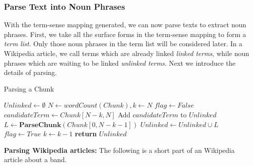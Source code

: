 \subsubsection{Parse Text into Noun Phrases}
\label{sec:parse}
With the term-sense mapping generated, we can now parse texts to
extract noun phrases.
First, we take all the surface forms in the term-sense mapping to
form a {\em term list}.
Only those noun phrases in the term list will be considered later.
In a Wikipedia article, we call terms which are already linked {\em linked terms},
while noun phrases which are waiting to be linked {\em unlinked terms}.
Next we introduce the details of parsing.

\begin{algorithm}[th]
\caption{Parsing a Chunk}
\label{parsechunk}
\begin{algorithmic}[1]
\State $Unlinked\leftarrow \emptyset$
\State $N\leftarrow wordCount(Chunk), k\leftarrow N$
\State $flag\leftarrow False$
\State $candidateTerm \leftarrow Chunk[N-k,N]$
\State Add $candidateTerm$ to $Unlinked$
\State $L \leftarrow \textbf{ParseChunk}(Chunk[0,N-k-1])$
\State $Unlinked \leftarrow Unlinked\cup L$
\State $flag\leftarrow True$
\EndIf
\EndIf
\State $k\leftarrow k-1$
\EndWhile
\State \textbf{return} $Unlinked$
\EndFunction
\end{algorithmic}
\end{algorithm}

\textbf{Parsing Wikipedia articles:}
The following is a short part of an Wikipedia article about
a band.


